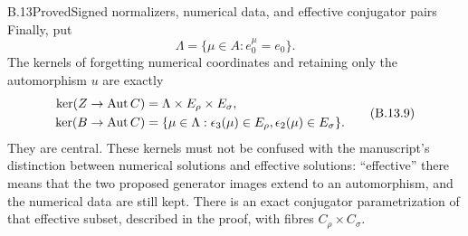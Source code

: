 \begin{statement}{B.13}{Proved}{Signed normalizers, numerical data, and effective conjugator pairs}
Finally, put
\[
 \Lambda=\{\mu\in A:e_0^\mu=e_0\}.
\]
The kernels of forgetting numerical coordinates and retaining only
the automorphism $u$ are exactly
\[
\begin{aligned}
 \ker(Z\to\operatorname{Aut} C)&=\Lambda\times E_\rho\times E_\sigma,\\
 \ker(B\to\operatorname{Aut} C)&=
 \{\mu\in\Lambda:\epsilon_3(\mu)\in E_\rho,
                         \epsilon_2(\mu)\in E_\sigma\}.
\end{aligned}
\tag{B.13.9}
\]
They are central. These kernels must not be confused with the
manuscript's distinction between numerical solutions and effective
solutions: ``effective'' there means that the two proposed generator
images extend to an automorphism, and the numerical data are still kept.
There is an exact conjugator parametrization of that effective subset,
described in the proof, with fibres $C_\rho\times C_\sigma$.
\end{statement}
